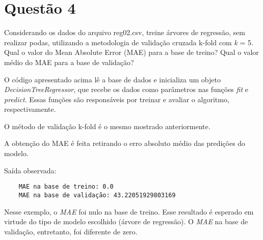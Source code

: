 \section{Questão 4}

Considerando os dados do arquivo reg02.csv, treine árvores de regressão, sem realizar podas, utilizando a metodologia de validação cruzada k-fold com \emph{k} = 5. Qual o valor do Mean Absolute Error (MAE) para a base de treino? Qual o valor médio do MAE para a base de validação?



O código apresentado acima lê a base de dados e inicializa um objeto \emph{DecisionTreeRegressor}, que recebe os dados como parâmetros nas funções \emph{fit} e \emph{predict}. Essas funções são responsáveis por treinar e avaliar o algoritmo, respectivamente.

O método de validação k-fold é o mesmo mostrado anteriormente.

A obtenção do MAE é feita retirando o erro absoluto médio das predições do modelo.

Saída observada:

\begin{lstlisting}
    MAE na base de treino: 0.0
    MAE na base de validação: 43.22051929803169
\end{lstlisting}

Nesse exemplo, o \emph{MAE} foi nulo na base de treino. Esse resultado é esperado em virtude do tipo de modelo escolhido (árvore de regressão). O \emph{MAE} na base de validação, entretanto, foi diferente de zero.